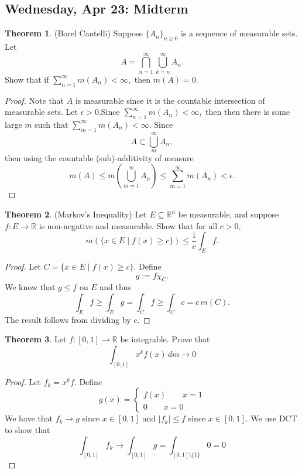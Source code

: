 \documentclass[10pt, oneside]{article}
\newcommand{\bbR}{\mathbb{R}}
\newcommand{\sm}{\setminus}
\theoremstyle{definition}
\newtheorem{thm}{Theorem}
\begin{document}
\subsection*{Wednesday, Apr 23: Midterm}
\begin{thm}
    (Borel Cantelli) Suppose $\{A_n\}_{n\geq 0}$ is a sequence of measurable sets. Let 
    \[A = \bigcap_{n=1}^\infty \bigcup_{k=n}^\infty A_n.\] Show that if $\sum_{n=1}^\infty m(A_n) < \infty,$ then $m(A)= 0.$
\end{thm}
\begin{proof}
Note that $A$ is measurable since it is the countable intersection of measurable sets. Let $\epsilon>0.$Since $\sum_{n=1}^\infty m(A_n) < \infty,$ then then there is some large $m$ such that $\sum_{m=1}^\infty m(A_n) < \infty.$ Since \[A\subset \bigcup_{m}^\infty A_n,\] then using the countable (sub)-additivity of measure \[m(A)  \leq m(\bigcup_{m=1}^\infty A_n) \leq \sum_{m=1}^\infty m(A_n) < \epsilon.\]
\end{proof}

\begin{thm} (Markov's Inequality)
    Let $E\subseteq \bbR^n$ be measurable, and suppose $f: E \to \bbR$ is non-negative and measurable. Show that for all $c>0,$ 
    \[m(\{x \in E \mid f(x) \geq c\}) \leq \frac{1}{c}\int_{E} f.\]
\end{thm}
\begin{proof}
    Let $C = \{x \in E \mid f(x) \geq c \}.$ Define 
    \[g:= f\chi_C.\] We know that $g \leq f$ on $E$ and thus
    \[\int_E f \geq \int_E g = \int_C f \geq \int_C c = c \,m(C).\] The result follows from dividing by $c.$
\end{proof}

\begin{thm}
    Let $f: [0,1] \to \bbR$ be integrable. Prove that 
    \[\int_{[0,
    1]} x^k f(x) \,dm\to 0\]
\end{thm}
\begin{proof}
    Let $f_k = x^k f.$ Define 
    \[g(x) = \begin{cases}
        f(x) \qquad x = 1\\
        0\qquad x = 0
    \end{cases}\] We have that $f_k \to g$ since $x\in [0,1]$ and $|f_k| \leq f$ since $x\in [0,1].$ We use DCT to show that 
    \[\int_{[0,1]} f_k \to \int_{[0,1]}g = \int_{[0,1]\sm \{1\}} 0 = 0\]
\end{proof}
\end{document}
